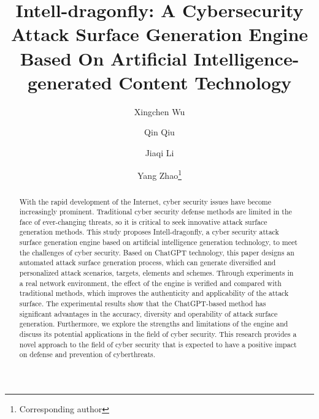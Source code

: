 \documentclass[runningheads]{llncs}
\begin{document}
%
\title{Intell-dragonfly: A Cybersecurity Attack Surface Generation Engine Based On Artificial Intelligence-generated Content Technology}
%
%
\author{Xingchen Wu \and
Qin Qiu \and
Jiaqi Li \and
Yang Zhao\thanks{Corresponding author}}


%
%
%
\maketitle
%
\begin{abstract}
With the rapid development of the Internet, cyber security issues have become increasingly prominent. Traditional cyber security defense methods are limited in the face of ever-changing threats, so it is critical to seek innovative attack surface generation methods. This study proposes Intell-dragonfly, a cyber security attack surface generation engine based on artificial intelligence generation technology, to meet the challenges of cyber security. Based on ChatGPT technology, this paper designs an automated attack surface generation process, which can generate diversified and personalized attack scenarios, targets, elements and schemes. Through experiments in a real network environment, the effect of the engine is verified and compared with traditional methods, which improves the authenticity and applicability of the attack surface. The experimental results show that the ChatGPT-based method has significant advantages in the accuracy, diversity and operability of attack surface generation. Furthermore, we explore the strengths and limitations of the engine and discuss its potential applications in the field of cyber security. This research provides a novel approach to the field of cyber security that is expected to have a positive impact on defense and prevention of cyberthreats.

\end{abstract}
%
%
%
\end{document}
